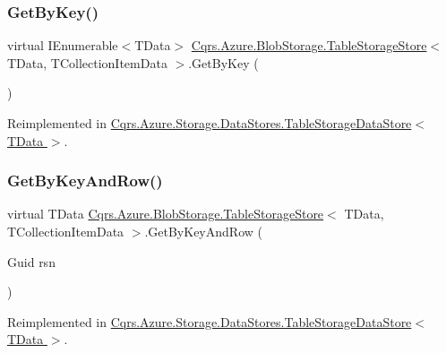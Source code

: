 \subsubsection{\texorpdfstring{Get\+By\+Key()}{GetByKey()}}
{\footnotesize\ttfamily virtual I\+Enumerable$<$T\+Data$>$ \hyperlink{classCqrs_1_1Azure_1_1BlobStorage_1_1TableStorageStore}{Cqrs.\+Azure.\+Blob\+Storage.\+Table\+Storage\+Store}$<$ T\+Data, T\+Collection\+Item\+Data $>$.Get\+By\+Key (\begin{DoxyParamCaption}{ }\end{DoxyParamCaption})\hspace{0.3cm}{\ttfamily [virtual]}}



Reimplemented in \hyperlink{classCqrs_1_1Azure_1_1Storage_1_1DataStores_1_1TableStorageDataStore_a79043a9d497f4027cf87e5ff78fe6098_a79043a9d497f4027cf87e5ff78fe6098}{Cqrs.\+Azure.\+Storage.\+Data\+Stores.\+Table\+Storage\+Data\+Store$<$ T\+Data $>$}.

\mbox{\label{classCqrs_1_1Azure_1_1BlobStorage_1_1TableStorageStore_ab7c4ae1a7b13e6bd1c36c242b753edba_ab7c4ae1a7b13e6bd1c36c242b753edba}} 
\subsubsection{\texorpdfstring{Get\+By\+Key\+And\+Row()}{GetByKeyAndRow()}}
{\footnotesize\ttfamily virtual T\+Data \hyperlink{classCqrs_1_1Azure_1_1BlobStorage_1_1TableStorageStore}{Cqrs.\+Azure.\+Blob\+Storage.\+Table\+Storage\+Store}$<$ T\+Data, T\+Collection\+Item\+Data $>$.Get\+By\+Key\+And\+Row (\begin{DoxyParamCaption}\item[{Guid}]{rsn }\end{DoxyParamCaption})\hspace{0.3cm}{\ttfamily [virtual]}}



Reimplemented in \hyperlink{classCqrs_1_1Azure_1_1Storage_1_1DataStores_1_1TableStorageDataStore_a61e3fc6404283606ec41a5e5a3c72ac8_a61e3fc6404283606ec41a5e5a3c72ac8}{Cqrs.\+Azure.\+Storage.\+Data\+Stores.\+Table\+Storage\+Data\+Store$<$ T\+Data $>$}.

